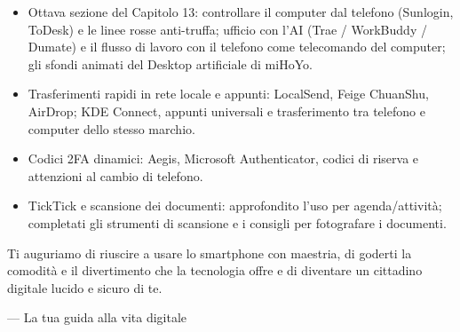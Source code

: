 
\begin{itemize}
  \item Ottava sezione del Capitolo 13: controllare il computer dal telefono (Sunlogin, ToDesk) e le linee rosse anti-truffa; ufficio con l'AI (Trae / WorkBuddy / Dumate) e il flusso di lavoro con il telefono come telecomando del computer; gli sfondi animati del Desktop artificiale di miHoYo.
  \item Trasferimenti rapidi in rete locale e appunti: LocalSend, Feige ChuanShu, AirDrop; KDE Connect, appunti universali e trasferimento tra telefono e computer dello stesso marchio.
  \item Codici 2FA dinamici: Aegis, Microsoft Authenticator, codici di riserva e attenzioni al cambio di telefono.
  \item TickTick e scansione dei documenti: approfondito l'uso per agenda/attività; completati gli strumenti di scansione e i consigli per fotografare i documenti.
\end{itemize}

Ti auguriamo di riuscire a usare lo smartphone con maestria, di goderti la comodità e il divertimento che la tecnologia offre e di diventare un cittadino digitale lucido e sicuro di te.

— La tua guida alla vita digitale
